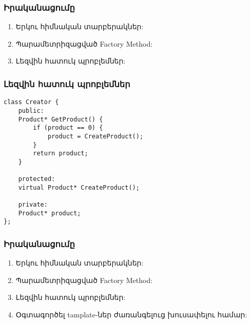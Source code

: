 \documentclass{beamer}
\begin{document}
\begin{frame}\frametitle{Իրականացումը}
\begin{enumerate}
    \item Երկու հիմնական տարբերակներ: \vspace{0.5cm}
    \item Պարամետրիզացված Factory Method: \vspace{0.5cm}
    \item Լեզվին հատուկ պրոբլեմներ: \vfill
\end{enumerate}
\end{frame}

\begin{frame}[fragile]\frametitle{Լեզվին հատուկ պրոբլեմներ}
\begin{english}
\begin{verbatim}
class Creator {
    public:
    Product* GetProduct() {
        if (product == 0) {
            product = CreateProduct();
        }
        return product;
    }

    protected:
    virtual Product* CreateProduct();

    private:
    Product* product;
};
\end{verbatim}
\end{english}
\end{frame}

\begin{frame}\frametitle{Իրականացումը}
\begin{enumerate}
    \item Երկու հիմնական տարբերակներ: \vspace{0.5cm}
    \item Պարամետրիզացված Factory Method: \vspace{0.5cm}
    \item Լեզվին հատուկ պրոբլեմներ: \vspace{0.5cm}
    \item Օգտագործել tamplate-ներ ժառանգելուց խուսափելու համար: \vfill
\end{enumerate}
\end{frame}
\end{document}
